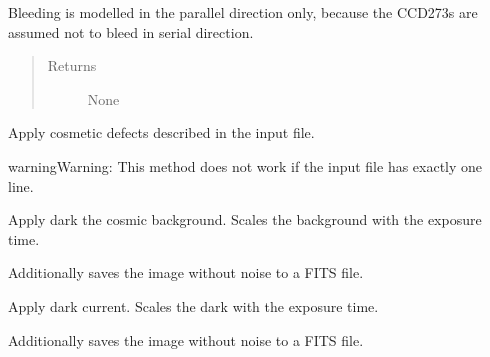 \documentclass[a4paper,11pt,english]{sphinxmanual}
\begin{document}
\begin{fulllineitems}
\begin{fulllineitems}
Bleeding is modelled in the parallel direction only, because the CCD273s are assumed not to bleed in
serial direction.
\begin{quote}\begin{description}
\item[{Returns}] \leavevmode
None

\end{description}\end{quote}

\end{fulllineitems}


\begin{fulllineitems}
\label{simulator:simulator.simulator.VISsimulator.applyCosmetics}
Apply cosmetic defects described in the input file.

\begin{notice}{warning}{Warning:}
This method does not work if the input file has exactly one line.
\end{notice}

\end{fulllineitems}


\begin{fulllineitems}
\label{simulator:simulator.simulator.VISsimulator.applyCosmicBackground}
Apply dark the cosmic background. Scales the background with the exposure time.

Additionally saves the image without noise to a FITS file.

\end{fulllineitems}


\begin{fulllineitems}
\label{simulator:simulator.simulator.VISsimulator.applyDarkCurrent}
Apply dark current. Scales the dark with the exposure time.

Additionally saves the image without noise to a FITS file.

\end{fulllineitems}



\end{fulllineitems}
\end{document}
